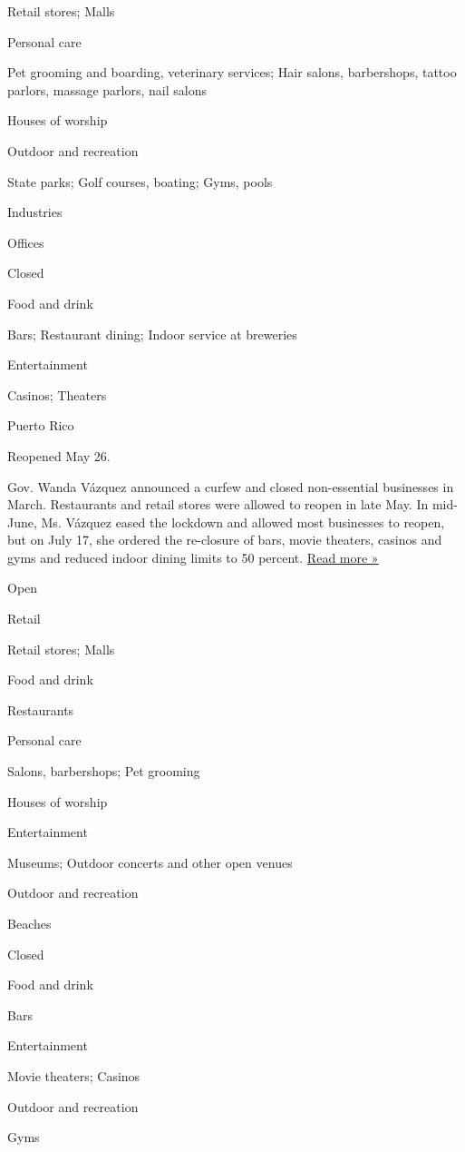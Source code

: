 Retail stores; Malls

Personal care

Pet grooming and boarding, veterinary services; Hair salons,
barbershops, tattoo parlors, massage parlors, nail salons

Houses of worship

Outdoor and recreation

State parks; Golf courses, boating; Gyms, pools

Industries

Offices

Closed

Food and drink

Bars; Restaurant dining; Indoor service at breweries

Entertainment

Casinos; Theaters

Puerto Rico

Reopened May 26.

Gov. Wanda Vázquez announced a curfew and closed non-essential
businesses in March. Restaurants and retail stores were allowed to
reopen in late May. In mid-June, Ms. Vázquez eased the lockdown and
allowed most businesses to reopen, but on July 17, she ordered the
re-closure of bars, movie theaters, casinos and gyms and reduced indoor
dining limits to 50 percent.
\href{https://www.bloomberg.com/news/articles/2020-07-16/puerto-rico-closes-bars-movie-theaters-casinos-amid-pandemic}{Read
more »}

Open

Retail

Retail stores; Malls

Food and drink

Restaurants

Personal care

Salons, barbershops; Pet grooming

Houses of worship

Entertainment

Museums; Outdoor concerts and other open venues

Outdoor and recreation

Beaches

Closed

Food and drink

Bars

Entertainment

Movie theaters; Casinos

Outdoor and recreation

Gyms

